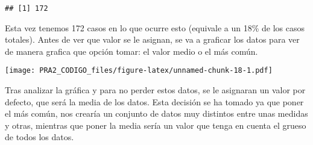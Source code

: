 \documentclass[
]{article}
\newenvironment{Shaded}{\begin{snugshade}}{\end{snugshade}}
\newcommand{\AttributeTok}[1]{\textcolor[rgb]{0.80,0.80,0.80}{#1}}
\newcommand{\CommentTok}[1]{\textcolor[rgb]{0.50,0.62,0.50}{#1}}
\newcommand{\DecValTok}[1]{\textcolor[rgb]{0.86,0.86,0.80}{#1}}
\newcommand{\FloatTok}[1]{\textcolor[rgb]{0.75,0.75,0.82}{#1}}
\newcommand{\FunctionTok}[1]{\textcolor[rgb]{0.94,0.94,0.56}{#1}}
\newcommand{\NormalTok}[1]{\textcolor[rgb]{0.80,0.80,0.80}{#1}}
\newcommand{\OtherTok}[1]{\textcolor[rgb]{0.94,0.94,0.56}{#1}}
\newcommand{\SpecialCharTok}[1]{\textcolor[rgb]{0.86,0.64,0.64}{#1}}
\newcommand{\StringTok}[1]{\textcolor[rgb]{0.80,0.58,0.58}{#1}}
\begin{document}
\begin{verbatim}
## [1] 172
\end{verbatim}

Esta vez tenemos 172 casos en lo que ocurre esto (equivale a un 18\% de
los casos totales). Antes de ver que valor se le asignan, se va a
graficar los datos para ver de manera grafica que opción tomar: el valor
medio o el más común.

\begin{Shaded}
\end{Shaded}

\texttt{[image: PRA2\_CODIGO\_files/figure-latex/unnamed-chunk-18-1.pdf]}

Tras analizar la gráfica y para no perder estos datos, se le asignaran
un valor por defecto, que será la media de los datos. Esta decisión se
ha tomado ya que poner el más común, nos crearía un conjunto de datos
muy distintos entre unas medidas y otras, mientras que poner la media
sería un valor que tenga en cuenta el grueso de todos los datos.

\begin{Shaded}
\end{Shaded}
\end{document}
